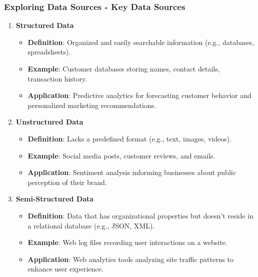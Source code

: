 \documentclass[aspectratio=169]{beamer}
\begin{document}
\begin{frame}[fragile]
    \frametitle{Exploring Data Sources - Key Data Sources}
    
    \begin{enumerate}
        \item \textbf{Structured Data}
        \begin{itemize}
            \item \textbf{Definition}: Organized and easily searchable information (e.g., databases, spreadsheets).
            \item \textbf{Example}: Customer databases storing names, contact details, transaction history.
            \item \textbf{Application}: Predictive analytics for forecasting customer behavior and personalized marketing recommendations.
        \end{itemize}
        
        \item \textbf{Unstructured Data}
        \begin{itemize}
            \item \textbf{Definition}: Lacks a predefined format (e.g., text, images, videos).
            \item \textbf{Example}: Social media posts, customer reviews, and emails.
            \item \textbf{Application}: Sentiment analysis informing businesses about public perception of their brand.
        \end{itemize}
        
        \item \textbf{Semi-Structured Data}
        \begin{itemize}
            \item \textbf{Definition}: Data that has organizational properties but doesn't reside in a relational database (e.g., JSON, XML).
            \item \textbf{Example}: Web log files recording user interactions on a website.
            \item \textbf{Application}: Web analytics tools analyzing site traffic patterns to enhance user experience.
        \end{itemize}
    \end{enumerate}
\end{frame}
\end{document}
